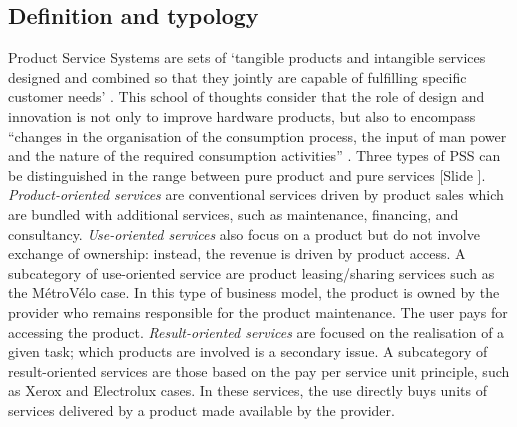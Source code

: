 \documentclass{article}
\newcounter{slide}
\begin{document}
\subsection{Definition and typology}
\label{sec:pssDefinition}
Product Service Systems are sets of ‘tangible products and intangible services designed and combined so that they jointly are capable of fulfilling specific customer needs’ \cite{tukkerEightTypesProduct2004}. This school of thoughts consider that the role of design and innovation is not only to improve hardware products, but also to encompass ``changes in the organisation of the consumption process, the input of man power and the nature of the required consumption activities'' \cite{meijkampChangingConsumerBehaviour1999}. Three types of PSS can be distinguished in the range between pure product and pure services {\color{blue}[Slide ]}. \emph{Product-oriented services} are conventional services driven by product sales which are bundled with additional services, such as maintenance, financing, and consultancy. \emph{Use-oriented services} also focus on a product but do not involve exchange of ownership: instead, the revenue is driven by product access. A subcategory of use-oriented service are product leasing/sharing services such as the MétroVélo case. In this type of business model, the product is owned by the provider who remains responsible for the product maintenance. The user pays for accessing the product. \emph{Result-oriented services} are focused on the realisation of a given task; which products are involved is a secondary issue. A subcategory of result-oriented services are those based on the pay per service unit principle, such as Xerox and Electrolux cases. In these services, the use directly buys units of services delivered by a product made available by the provider.
\end{document}
